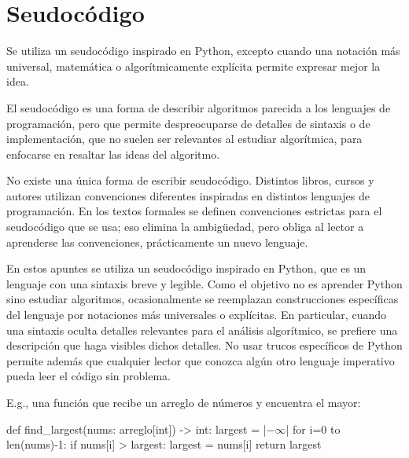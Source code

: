 \section{Seudocódigo}

\begin{tldr}
  Se utiliza un seudocódigo inspirado en Python, excepto cuando una notación más universal, matemática o algorítmicamente explícita permite expresar mejor la idea.
\end{tldr}

El seudocódigo es una forma de describir algoritmos parecida a los lenguajes de programación, pero que permite despreocuparse de detalles de sintaxis o de implementación, que no suelen ser relevantes al estudiar algorítmica, para enfocarse en resaltar las ideas del algoritmo. 

No existe una única forma de escribir seudocódigo. Distintos libros, cursos y autores utilizan convenciones diferentes inspiradas en distintos lenguajes de programación. En los textos formales se definen convenciones estrictas para el seudocódigo que se usa; eso elimina la ambigüedad, pero obliga al lector a aprenderse las convenciones, prácticamente un nuevo lenguaje. 

En estos apuntes se utiliza un seudocódigo inspirado en Python, que es un lenguaje con una sintaxis breve y legible. Como el objetivo no es aprender Python sino estudiar algoritmos, ocasionalmente se reemplazan construcciones específicas del lenguaje por notaciones más universales o explícitas. En particular, cuando una sintaxis oculta detalles relevantes para el análisis algorítmico, se prefiere una descripción que haga visibles dichos detalles. No usar trucos específicos de Python permite además que cualquier lector que conozca algún otro lenguaje imperativo pueda leer el código sin problema.

E.g., una función que recibe un arreglo de números y encuentra el mayor:
\begin{pseudocode}
def find_largest(nums: arreglo[int]) -> int:
    largest = |$-\infty$|
    for i=0 to len(nums)-1:
        if nums[i] > largest:
            largest = nums[i]
    return largest
\end{pseudocode}

